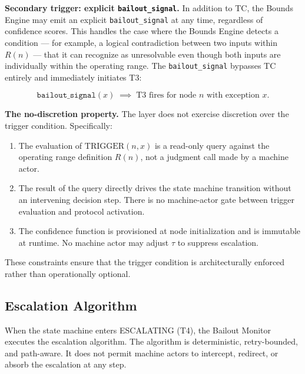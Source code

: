 \medskip
\noindent\textbf{Secondary trigger: explicit \texttt{bailout\_signal}.} In addition to TC, the Bounds Engine may emit an explicit \texttt{bailout\_signal} at any time, regardless of confidence scores. This handles the case where the Bounds Engine detects a condition — for example, a logical contradiction between two inputs within $R(n)$ — that it can recognize as unresolvable even though both inputs are individually within the operating range. The \texttt{bailout\_signal} bypasses TC entirely and immediately initiates T3:

\begin{equation}
\texttt{bailout\_signal}(x) \;\implies\; \text{T3 fires for node } n \text{ with exception } x. \tag{TC-secondary}
\end{equation}

\medskip
\noindent\textbf{The no-discretion property.} The \bounds{} layer does not exercise discretion over the trigger condition. Specifically:

\begin{enumerate}
    \item The evaluation of $\text{TRIGGER}(n, x)$ is a read-only query against the operating range definition $R(n)$, not a judgment call made by a machine actor.
    \item The result of the query directly drives the state machine transition without an intervening decision step. There is no machine-actor gate between trigger evaluation and protocol activation.
    \item The confidence function is provisioned at node initialization and is immutable at runtime. No machine actor may adjust $\tau$ to suppress escalation.
\end{enumerate}

These constraints ensure that the trigger condition is architecturally enforced rather than operationally optional.

\subsection{Escalation Algorithm}\label{sec:escalation-algorithm}

When the state machine enters ESCALATING (T4), the Bailout Monitor executes the escalation algorithm. The algorithm is deterministic, retry-bounded, and path-aware. It does not permit machine actors to intercept, redirect, or absorb the escalation at any step.

